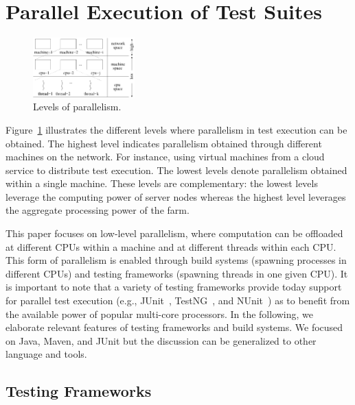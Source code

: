 \newcommand{\Seq}{C0}
\newcommand{\SeqClassParMeth}{C1}
\newcommand{\ParClassSeqMeth}{C2}
\newcommand{\ParClassParMeth}{C3}
\newcommand{\Fork}{F}
\newcommand{\ForkSeq}{\Fork{}\Seq{}}
\newcommand{\ForkParMeth}{\Fork{}\SeqClassParMeth{}}

\section{Parallel Execution of Test Suites}
\label{sec:modes}

\begin{figure}[t!]
  \centering
  \includegraphics[width=0.35\textwidth]{figs/parallel-levels.pdf}
  \vspace{-1ex}
  \caption{\label{fig:levels}Levels of parallelism.}
\end{figure}

Figure~\ref{fig:levels} illustrates the different levels where
parallelism in test execution can be obtained.
The highest level indicates
parallelism obtained through different machines on the
network.  For instance, using virtual machines from a cloud service to
distribute test execution.  The lowest levels denote parallelism
obtained within a single machine.  These levels are complementary:
the lowest levels leverage the computing power of server
nodes whereas the highest level leverages the aggregate processing
power of the farm.

This paper focuses on low-level parallelism, where computation can be
offloaded at different CPUs within a machine and at different threads
within each CPU.  This form of parallelism is enabled through build
systems (spawning processes in different CPUs) and testing frameworks
(spawning threads in one given CPU).  It is important to note that a variety
of testing frameworks provide today support for parallel test
execution (e.g., JUnit~\cite{junit-org}, TestNG~\cite{testng}, and
NUnit~\cite{nunit}) as to benefit from the available power of popular multi-core processors.
In the following, we elaborate relevant features of testing frameworks
and build systems.  We focused on Java, Maven, and JUnit but the
discussion can be generalized to other language and tools.

\subsection{Testing Frameworks}
\label{sec:frameworks}

